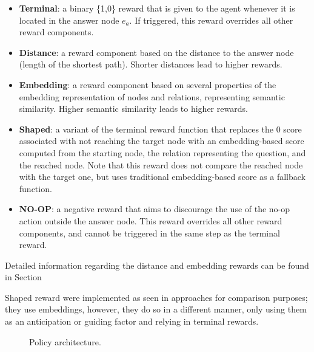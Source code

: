 \begin{itemize}
    \item \textbf{Terminal}: a binary \{1,0\} reward that is given to the agent whenever it is located in the answer node $e_a$. If triggered, this reward overrides all other reward components.
    \item \textbf{Distance}: a reward component based on the distance to the answer node (length of the shortest path). Shorter distances lead to higher rewards.
    \item \textbf{Embedding}: a reward component based on several properties of the embedding representation of nodes and relations, representing semantic similarity. Higher semantic similarity leads to higher rewards.
    \item \textbf{Shaped}: a variant of the terminal reward function that replaces the 0 score associated with not reaching the target node with an embedding-based score computed from the starting node, the relation representing the question, and the reached node. Note that this reward does not compare the reached node with the target one, but uses traditional embedding-based score as a fallback function.
    \item \textbf{NO-OP}: a negative reward that aims to discourage the use of the no-op action outside the answer node. This reward overrides all other reward components, and cannot be triggered in the same step as the terminal reward.
\end{itemize}

Detailed information regarding the distance and embedding rewards can be found in Section
 
Shaped reward were implemented as seen in approaches
for comparison purposes; they use embeddings, however, they do so in a different manner, only using them as an anticipation or guiding factor and relying in terminal rewards.

\begin{figure}[!h]
    \caption{Policy architecture.}
    \label{fig:policy}
\end{figure}

